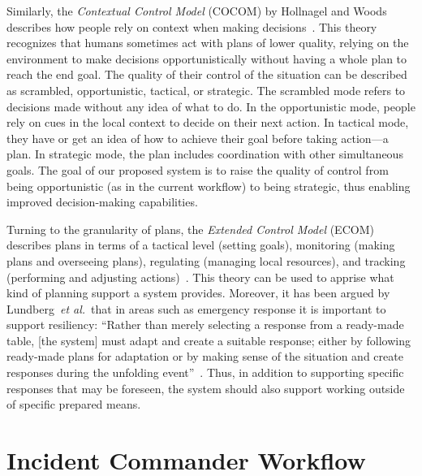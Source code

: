 \documentclass[review,journal]{vgtc}         %
\def\etal{\textit{et al.}}
\begin{document}
Similarly, the \emph{Contextual Control Model} (COCOM) by Hollnagel and Woods describes how people rely on context when making decisions~\cite{hollnagel2005joint}. This theory recognizes that humans sometimes act with plans of lower quality, relying on the environment to make decisions opportunistically without having a whole plan to reach the end goal. The quality of their control of the situation can be described as scrambled, opportunistic, tactical, or strategic. The scrambled mode refers to decisions made without any idea of what to do. In the opportunistic mode, people rely on cues in the local context to decide on their next action. In tactical mode, they have or get an idea of how to achieve their goal before taking action---a plan. In strategic mode, the plan includes coordination with other simultaneous goals. The goal of our proposed system is to raise the quality of control from being opportunistic (as in the current workflow) to being strategic, thus enabling improved decision-making capabilities.

Turning to the granularity of plans, the \emph{Extended Control Model} (ECOM) describes plans in terms of a tactical level (setting goals), monitoring (making plans and overseeing plans), regulating (managing local resources), and tracking (performing and adjusting actions)~\cite{hollnagel2005joint}. This theory can be used to apprise what kind of planning support a system provides.  Moreover, it has been argued by Lundberg~\etal\ that in areas such as emergency response it is important to support resiliency: ``Rather than merely selecting a response from a ready-made table, [the system] must adapt and create a suitable response; either by following ready-made plans for adaptation or by making sense of the situation and create responses during the unfolding event''~\cite{Lundberg2012}. Thus, in addition to supporting specific responses that may be foreseen, the system should also support working outside of specific prepared means.


\section{Incident Commander Workflow} \label{sec:workflow}
\end{document}
